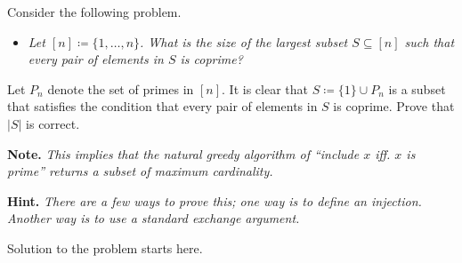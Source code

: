 \documentclass{article}
\begin{document}
\begin{question}
Consider the following problem.

\begin{itemize}
    \item[] {\em Let $[n] \coloneqq \{1, \dots, n\}$. What is the size of the largest subset $S \subseteq [n]$ such that every pair of elements in $S$ is coprime?}
\end{itemize}

Let $P_n$ denote the set of primes in $[n]$. It is clear that $S \coloneqq \{1\} \cup P_n$ is a subset that satisfies the condition that every pair of elements in $S$ is coprime. Prove that $\lvert S \rvert$ is correct.

{\bfseries Note.} {\em This implies that the natural greedy algorithm of ``include $x$ iff. $x$ is prime'' returns a subset of maximum cardinality.}

{\bfseries Hint.} {\em There are a few ways to prove this; one way is to define an injection. Another way is to use a standard exchange argument.}
\end{question}

\begin{solution}
Solution to the problem starts here.
\end{solution}
\end{document}
